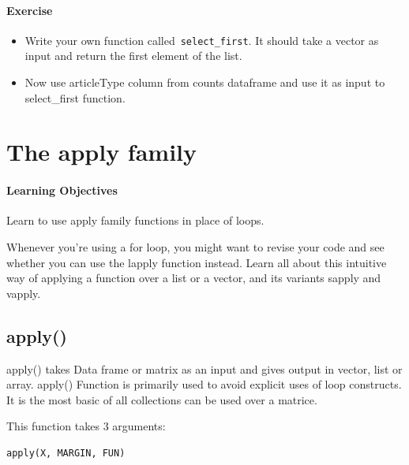 \documentclass[
]{book}
\providecommand{\tightlist}{%
  \setlength{\itemsep}{0pt}\setlength{\parskip}{0pt}}
\begin{document}
\hypertarget{exercise}{%
\subsubsection*{Exercise}\label{exercise}}

\begin{itemize}
\tightlist
\item
  Write your own function called~\texttt{select\_first}. It should take a vector as input and return the first element of the list.
\item
  Now use articleType column from counts dataframe and use it as input to select\_first function.
\end{itemize}

\hypertarget{the-apply-family}{%
\chapter{The apply family}\label{the-apply-family}}

\hypertarget{learning-objectives-2}{%
\subsubsection*{Learning Objectives}\label{learning-objectives-2}}

Learn to use apply family functions in place of loops.

Whenever you're using a for loop, you might want to revise your code and see whether you can use the lapply function instead. Learn all about this intuitive way of applying a function over a list or a vector, and its variants sapply and vapply.

\hypertarget{apply}{%
\section{apply()}\label{apply}}

apply() takes Data frame or matrix as an input and gives output in vector, list or array. apply() Function is primarily used to avoid explicit uses of loop constructs. It is the most basic of all collections can be used over a matrice.

This function takes 3 arguments:

\begin{verbatim}
apply(X, MARGIN, FUN)
\end{verbatim}
\end{document}

